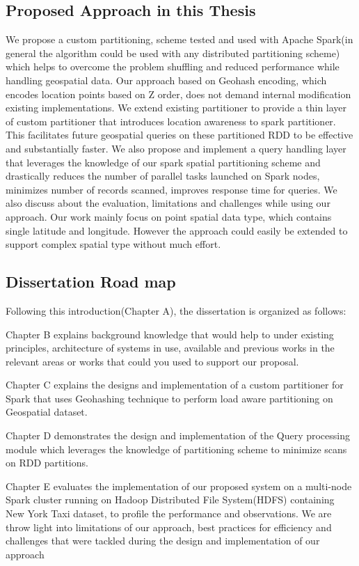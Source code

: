 \documentclass[article,type=msc,colorback,10pt,accentcolor=tud1d]{tudthesis}
\begin{document}
		\subsection{Proposed Approach in this Thesis}
		\par We propose a custom partitioning, scheme tested and used with Apache Spark(in general the algorithm could be used with any distributed partitioning scheme) which helps to overcome the problem shuffling and reduced performance while handling geospatial data. Our approach based on Geohash encoding, which encodes location points based on Z order, does not demand internal modification existing implementations. We extend existing partitioner to provide a thin layer of custom partitioner that introduces location awareness to spark partitioner. This facilitates future geospatial queries on these partitioned RDD to be effective and substantially faster. We also propose and implement a query handling layer that leverages the knowledge of our spark spatial partitioning scheme and drastically reduces the number of parallel tasks launched on Spark nodes, minimizes number of records scanned, improves response time for queries. We also discuss about the evaluation, limitations and challenges while using our approach. Our work mainly focus on point spatial data type, which contains single latitude and longitude. However the approach could easily be extended to support complex spatial type without much effort.
		
		
		\subsection{Dissertation Road map}
		
		Following this introduction(Chapter A), the dissertation is organized as follows: 
		
		Chapter B explains background knowledge that would help to under existing principles, architecture of systems in use, available and previous works in the relevant areas or works that could you used to support our proposal.  
		
		Chapter C explains the designs and implementation of a custom partitioner for Spark that uses Geohashing technique to perform load aware partitioning on Geospatial dataset.
		
		Chapter D demonstrates the design and implementation of the Query processing module which leverages the knowledge of partitioning scheme to minimize scans on RDD partitions. 
		
		Chapter E evaluates the implementation of our proposed system on a multi-node Spark cluster running on Hadoop Distributed File System(HDFS) containing New York Taxi dataset, to profile the performance and observations. We are throw light into limitations of our approach, best practices for efficiency and challenges that were tackled during the design and implementation of our approach
		
\end{document}
